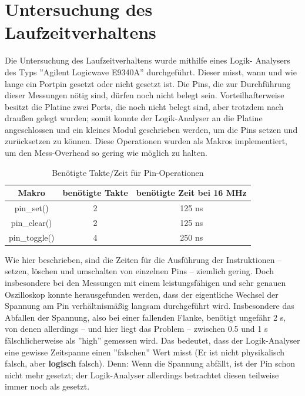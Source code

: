 \chapter{Untersuchung des Laufzeitverhaltens}
Die Untersuchung des Laufzeitverhaltens wurde mithilfe eines Logik-
Analysers des Typs ''Agilent Logicwave E9340A'' durchgeführt. Dieser misst, wann und wie lange
ein Portpin gesetzt oder nicht gesetzt ist. Die Pins, die zur Durchführung
dieser Messungen nötig sind, dürfen noch nicht belegt sein. Vorteilhafterweise
besitzt die Platine zwei Ports, die noch nicht belegt sind, aber
trotzdem nach draußen gelegt wurden; somit konnte der Logik-Analyser
an die Platine angeschlossen und ein kleines Modul
geschrieben werden, um die Pins setzen und zurücksetzen zu
können. Diese Operationen wurden als Makros implementiert, um den
Mess-Overhead so gering wie möglich zu halten.
\begin{table}[htb]
\begin{center}
	\begin{tabular}{|c||c|c|}
		\hline
		\textbf{Makro} & \textbf{benötigte Takte} & \textbf{benötigte Zeit bei 16 MHz} \\ \hline \hline
		pin\_set() & 2 & 125 ns \\ \hline
		pin\_clear() & 2 & 125 ns \\ \hline
		pin\_toggle() & 4 & 250 ns \\ \hline
	\end{tabular}
	\caption{\label{pin_takte} Benötigte Takte/Zeit für Pin-Operationen}
\end{center}
\end{table}
Wie hier beschrieben, sind die Zeiten für die Ausführung der Instruktionen
-- setzen, löschen und umschalten von einzelnen Pins -- ziemlich gering.
Doch insbesondere bei den Messungen mit einem leistungsfähigen und
sehr genauen Oszilloskop konnte herausgefunden werden, dass der eigentliche
Wechsel der Spannung am Pin verhältnismäßig langsam durchgeführt wird.
Insbesondere das Abfallen der Spannung, also bei einer fallenden Flanke,
benötigt ungefähr 2 \textmu{}s, von denen allerdings -- und hier liegt das Problem -- zwischen
0.5 und 1 \textmu{}s fälschlicherweise als ''high'' gemessen wird.
Das bedeutet, dass der Logik-Analyser eine gewisse Zeitspanne einen ''falschen''
Wert misst (Er ist nicht physikalisch falsch, aber \textbf{logisch} falsch).
Denn: Wenn die Spannung abfällt, ist der Pin schon nicht mehr gesetzt; der
Logik-Analyser allerdings betrachtet diesen teilweise immer noch als gesetzt.
